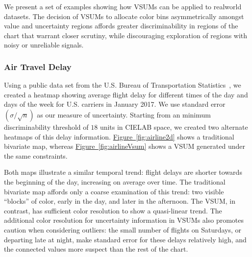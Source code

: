 \documentclass{vgtc}                          %
\newcommand{\figref}[1]{\hyperref[#1]{Figure~\ref*{#1}}}
\begin{document}
We present a set of examples showing how VSUMs can be applied to realworld datasets. The decision of VSUMs to allocate color bins asymmetrically amongst value and uncertainty regions affords greater discriminability in regions of the chart that warrant closer scrutiny, while discouraging exploration of regions with noisy or unreliable signals.


\subsubsection{Air Travel Delay}

\airlineFig

Using a public data set from the U.S. Bureau of Transportation Statistics~\cite{bts}, we created a heatmap showing average flight delay for different times of the day and days of the week for U.S. carriers in January 2017. We use standard error $\left(\sigma / \sqrt{n}\right)$ as our measure of uncertainty. Starting from an minimum discriminability threshold of $18$ units in CIELAB space, we created two alternate heatmaps of this delay information. \figref{fig:airline2d} shows a traditional bivariate map, whereas \figref{fig:airlineVsum} shows a VSUM generated under the same constraints.

Both maps illustrate a similar temporal trend: flight delays are shorter towards the beginning of the day, increasing on average over time. The traditional bivariate map affords only a coarse examination of this trend: two visible ``blocks'' of color, early in the day, and later in the afternoon. The VSUM, in contrast, has sufficient color resolution to show a quasi-linear trend. The additional color resolution for uncertainty information in VSUMs also promotes caution when considering outliers: the small number of flights on Saturdays, or departing late at night, make standard error for these delays relatively high, and the connected values more suspect than the rest of the chart.

\viralFig
\end{document}
